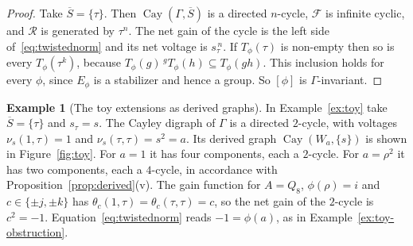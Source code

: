 \documentclass[12pt,letterpaper]{article}
\numberwithin{equation}{section}
\theoremstyle{plain}
\theoremstyle{definition}
\newtheorem{example}[theorem]{Example}
\newcommand{\act}[2]{{}^{#1}\!#2}          %
\newcommand{\fr}{\mathcal{F}}             %
\newcommand{\rel}{\mathcal{R}}            %
\DeclareMathOperator{\Cay}{Cay}
\begin{document}
\begin{proof}
Take $\overline{S}=\{\tau\}$. Then $\Cay(\Gamma,\overline{S})$ is a
directed $n$-cycle, $\fr$ is infinite cyclic, and $\rel$ is generated by
$\tau^n$. The net gain of the cycle is the left side
of~\eqref{eq:twistednorm} and its net voltage is $s_\tau^{\,n}$. If
$T_\phi(\tau)$ is non-empty then so is every $T_\phi(\tau^k)$, because
$T_\phi(g)\,\act{g}{T_\phi(h)}\subseteq T_\phi(gh)$. This inclusion holds
for every $\phi$, since $E_\phi$ is a stabilizer and hence a group. So
$[\phi]$ is $\Gamma$-invariant.
\end{proof}

\begin{example}[The toy extensions as derived graphs]\label{ex:toy-graph}
In Example~\ref{ex:toy} take $\overline{S}=\{\tau\}$ and $s_\tau=s$. The
Cayley digraph of $\Gamma$ is a directed $2$-cycle, with voltages
$\nu_s(1,\tau)=1$ and $\nu_s(\tau,\tau)=s^2=a$. Its derived graph
$\Cay(W_a,\{s\})$ is shown in Figure~\ref{fig:toy}. For $a=1$ it has four
components, each a $2$-cycle. For $a=\rho^2$ it has two components, each a
$4$-cycle, in accordance with Proposition~\ref{prop:derived}(v). The gain
function for $A=Q_8$, $\phi(\rho)=i$ and $c\in\{\pm j,\pm k\}$ has
$\theta_c(1,\tau)=\theta_c(\tau,\tau)=c$, so the net gain of the $2$-cycle
is $c^2=-1$. Equation~\eqref{eq:twistednorm} reads $-1=\phi(a)$, as in
Example~\ref{ex:toy-obstruction}.
\end{example}
\end{document}
